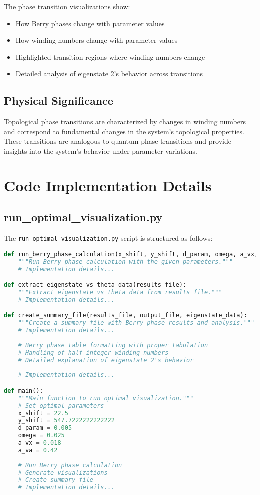 \documentclass{article}
\begin{document}
The phase transition visualizations show:

\begin{itemize}
    \item How Berry phases change with parameter values
    \item How winding numbers change with parameter values
    \item Highlighted transition regions where winding numbers change
    \item Detailed analysis of eigenstate 2's behavior across transitions
\end{itemize}

\subsection{Physical Significance}

Topological phase transitions are characterized by changes in winding numbers and correspond to fundamental changes in the system's topological properties. These transitions are analogous to quantum phase transitions and provide insights into the system's behavior under parameter variations.

\section{Code Implementation Details}

\subsection{run\_optimal\_visualization.py}

The \texttt{run\_optimal\_visualization.py} script is structured as follows:

\begin{lstlisting}[language=Python, caption=Key components of run\_optimal\_visualization.py]
def run_berry_phase_calculation(x_shift, y_shift, d_param, omega, a_vx, a_va, theta_step=1):
    """Run Berry phase calculation with the given parameters."""
    # Implementation details...

def extract_eigenstate_vs_theta_data(results_file):
    """Extract eigenstate vs theta data from results file."""
    # Implementation details...

def create_summary_file(results_file, output_file, eigenstate_data):
    """Create a summary file with Berry phase results and analysis."""
    # Implementation details...
    
    # Berry phase table formatting with proper tabulation
    # Handling of half-integer winding numbers
    # Detailed explanation of eigenstate 2's behavior
    
    # Implementation details...

def main():
    """Main function to run optimal visualization."""
    # Set optimal parameters
    x_shift = 22.5
    y_shift = 547.7222222222222
    d_param = 0.005
    omega = 0.025
    a_vx = 0.018
    a_va = 0.42
    
    # Run Berry phase calculation
    # Generate visualizations
    # Create summary file
    # Implementation details...
\end{lstlisting}
\end{document}
